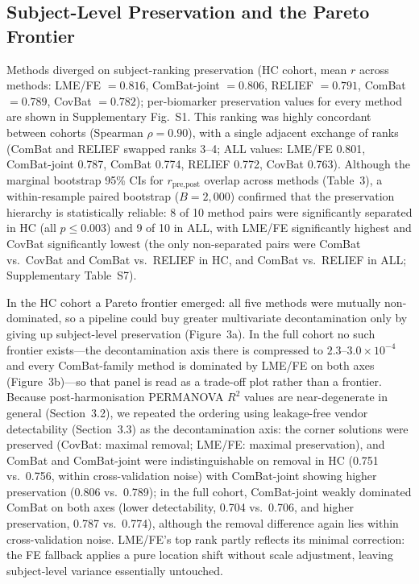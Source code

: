 \documentclass[12pt,a4paper]{article}
\begin{document}
\subsection{Subject-Level Preservation and the Pareto Frontier}

Methods diverged on subject-ranking preservation (HC cohort, mean $r$ across methods: LME/FE $=0.816$, ComBat-joint $=0.806$, RELIEF $=0.791$, ComBat $=0.789$, CovBat $=0.782$); per-biomarker preservation values for every method are shown in Supplementary Fig.~S1. This ranking was highly concordant between cohorts (Spearman $\rho=0.90$), with a single adjacent exchange of ranks (ComBat and RELIEF swapped ranks 3--4; ALL values: LME/FE 0.801, ComBat-joint 0.787, ComBat 0.774, RELIEF 0.772, CovBat 0.763). Although the marginal bootstrap 95\% CIs for $r_{\text{pre,post}}$ overlap across methods (Table~3), a within-resample paired bootstrap ($B=2{,}000$) confirmed that the preservation hierarchy is statistically reliable: 8 of 10 method pairs were significantly separated in HC (all $p\leq0.003$) and 9 of 10 in ALL, with LME/FE significantly highest and CovBat significantly lowest (the only non-separated pairs were ComBat vs.\ CovBat and ComBat vs.\ RELIEF in HC, and ComBat vs.\ RELIEF in ALL; Supplementary Table~S7).

In the HC cohort a Pareto frontier emerged: all five methods were mutually non-dominated, so a pipeline could buy greater multivariate decontamination only by giving up subject-level preservation (Figure~3a). In the full cohort no such frontier exists---the decontamination axis there is compressed to $2.3$--$3.0\times10^{-4}$ and every ComBat-family method is dominated by LME/FE on both axes (Figure~3b)---so that panel is read as a trade-off plot rather than a frontier. Because post-harmonisation PERMANOVA $R^2$ values are near-degenerate in general (Section~3.2), we repeated the ordering using leakage-free vendor detectability (Section~3.3) as the decontamination axis: the corner solutions were preserved (CovBat: maximal removal; LME/FE: maximal preservation), and ComBat and ComBat-joint were indistinguishable on removal in HC (0.751 vs.\ 0.756, within cross-validation noise) with ComBat-joint showing higher preservation (0.806 vs.\ 0.789); in the full cohort, ComBat-joint weakly dominated ComBat on both axes (lower detectability, 0.704 vs.\ 0.706, and higher preservation, 0.787 vs.\ 0.774), although the removal difference again lies within cross-validation noise. LME/FE's top rank partly reflects its minimal correction: the FE fallback applies a pure location shift without scale adjustment, leaving subject-level variance essentially untouched.
\end{document}
